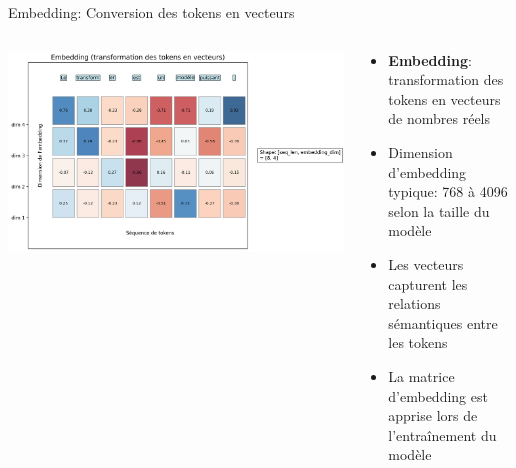 \documentclass[aspectratio=169]{beamer}
\begin{document}
\begin{frame}{Embedding: Conversion des tokens en vecteurs}
    \begin{columns}
        \begin{column}{0.6\textwidth}
            \begin{center}
                \includegraphics[width=\textwidth]{images/generated/embedding_process.png}
            \end{center}
        \end{column}
        \begin{column}{0.4\textwidth}
            \begin{itemize}
                \item \textbf{Embedding}: transformation des tokens en vecteurs de nombres réels
                \item Dimension d'embedding typique: 768 à 4096 selon la taille du modèle
                \item Les vecteurs capturent les relations sémantiques entre les tokens
                \item La matrice d'embedding est apprise lors de l'entraînement du modèle
            \end{itemize}
        \end{column}
    \end{columns}
\end{frame}
\end{document}
